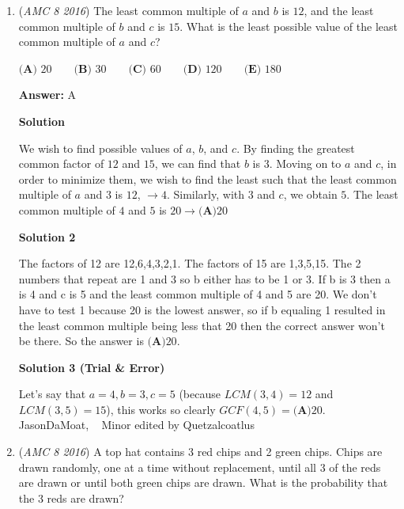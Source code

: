 \begin{enumerate}
 Edit(dnathan12): For clarity, you add 48, because you want the largest number in the list. 376 is the smallest number~AfterglowBlaziken

 


	\item (\textit{AMC 8 2016}) The least common multiple of $a$ and $b$ is $12$, and the least common multiple of $b$ and $c$ is $15$. What is the least possible value of the least common multiple of $a$ and $c$?


 $\textbf{(A) }20\qquad\textbf{(B) }30\qquad\textbf{(C) }60\qquad\textbf{(D) }120\qquad \textbf{(E) }180$

 \textbf{Answer: }A



\textbf{Solution}

We wish to find possible values of $a$, $b$, and $c$. By finding the greatest common factor of $12$ and $15$, we can find that $b$ is 3. Moving on to $a$ and $c$, in order to minimize them, we wish to find the least such that the least common multiple of $a$ and $3$ is $12$, $\rightarrow 4$. Similarly, with $3$ and $c$, we obtain $5$. The least common multiple of $4$ and $5$ is $20 \rightarrow \boxed{\textbf{(A)} 20}$




\textbf{Solution 2}

The factors of 12 are 12,6,4,3,2,1. The factors of 15 are 1,3,5,15. The 2 numbers that repeat are 1 and 3 so b either has to be 1 or 3. If b is 3 then a is 4 and c is 5 and the least common multiple of 4 and 5 are 20. We don't have to test 1 because 20 is the lowest answer, so if b equaling 1 resulted in the least common multiple being less that 20 then the correct answer won't be there. So the answer is $\boxed{\textbf{(A)} 20}$.

 



\textbf{Solution 3 (Trial & Error)}

Let's say that $a = 4, b = 3, c = 5$ (because $LCM(3,4)=12$ and $LCM(3,5)=15$), this works so clearly $GCF(4, 5) = \boxed{\textbf{(A)} 20}$. ~ JasonDaMoat, ~ Minor edited by Quetzalcoatlus

 


 


 


	\item (\textit{AMC 8 2016}) A top hat contains 3 red chips and 2 green chips. Chips are drawn randomly, one at a time without replacement, until all 3 of the reds are drawn or until both green chips are drawn. What is the probability that the 3 reds are drawn?



\end{enumerate}
